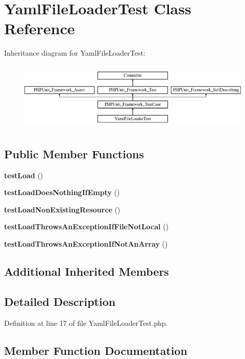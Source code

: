 \section{Yaml\+File\+Loader\+Test Class Reference}
\label{class_symfony_1_1_component_1_1_translation_1_1_tests_1_1_loader_1_1_yaml_file_loader_test}
Inheritance diagram for Yaml\+File\+Loader\+Test\+:\begin{figure}[H]
\begin{center}
\leavevmode
\includegraphics[height=3.303835cm]{class_symfony_1_1_component_1_1_translation_1_1_tests_1_1_loader_1_1_yaml_file_loader_test}
\end{center}
\end{figure}
\subsection*{Public Member Functions}
\begin{DoxyCompactItemize}
\item 
{\bf test\+Load} ()
\item 
{\bf test\+Load\+Does\+Nothing\+If\+Empty} ()
\item 
{\bf test\+Load\+Non\+Existing\+Resource} ()
\item 
{\bf test\+Load\+Throws\+An\+Exception\+If\+File\+Not\+Local} ()
\item 
{\bf test\+Load\+Throws\+An\+Exception\+If\+Not\+An\+Array} ()
\end{DoxyCompactItemize}
\subsection*{Additional Inherited Members}


\subsection{Detailed Description}


Definition at line 17 of file Yaml\+File\+Loader\+Test.\+php.



\subsection{Member Function Documentation}
